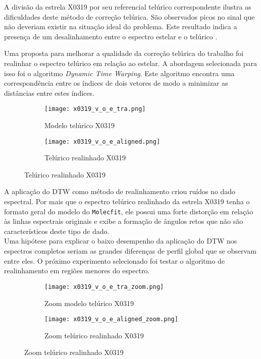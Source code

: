 \documentclass[a1]{sciposter}
\begin{document}
\begin{multicols}{2}
A divisão da estrela X0319 \cite{Chen2014TheXS} por seu referencial telúrico correspondente ilustra as dificuldades deste método de correção telúrica. São observados picos no sinal que não deveriam existir na situação ideal do problema. Este resultado indica a presença de um desalinhamento entre o espectro estelar e o telúrico \cite{unpublished-xshooter-data-release}.


Uma proposta para melhorar a qualidade da correção telúrica do trabalho foi realinhar o espectro telúrico em relação ao estelar. A abordagem selecionada para isso foi o algoritmo \textit{Dynamic Time Warping}. Este algoritmo encontra uma correspondência entre os índices de dois vetores de modo a minimizar as distâncias entre estes índices.

\begin{figure}
 \centering
 \begin{subfigure}{0.4\textwidth}
  \centering
  \texttt{[image: x0319\_v\_o\_e\_tra.png]}
  \caption{Modelo telúrico X0319}
 \end{subfigure}\hfil
 \begin{subfigure}{0.4\textwidth}
  \centering
  \texttt{[image: x0319\_v\_o\_e\_aligned.png]}
  \caption{Telúrico realinhado X0319}
 \end{subfigure}\hfil
\end{figure}

A aplicação do DTW como método de realinhamento criou ruídos no dado espectral. Por mais que o espectro telúrico realinhado da estrela X0319 \cite{Chen2014TheXS} tenha o formato geral do modelo do \texttt{Molecfit}, ele possui uma forte distorção em relação às linhas espectrais originais e exibe a formação de ângulos retos que não são característicos deste tipo de dado. \\

Uma hipótese para explicar o baixo desempenho da aplicação do DTW nos espectros completos seriam as grandes diferenças de perfil global que se observam entre eles. O próximo experimento selecionado foi testar o algoritmo de realinhamento em regiões menores do espectro.

\begin{figure}
 \centering
 \begin{subfigure}{0.4\textwidth}
  \centering
  \texttt{[image: x0319\_v\_o\_e\_tra\_zoom.png]}
  \caption{Zoom modelo telúrico X0319}
 \end{subfigure}\hfil
 \begin{subfigure}{0.4\textwidth}
  \centering
  \texttt{[image: x0319\_v\_o\_e\_aligned\_zoom.png]}
  \caption{Zoom telúrico realinhado X0319}
 \end{subfigure}\hfil
\end{figure}


\end{multicols}
\end{document}
